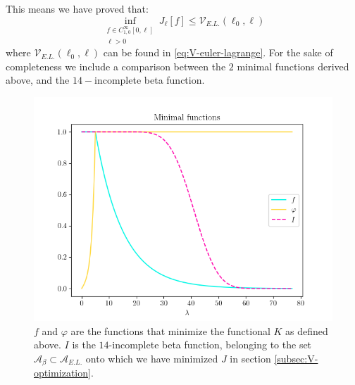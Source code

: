 This means we have proved that:
\[
    \inf_{\substack{f\in C^{\infty}_{1,0}[0, \ell]\\ \ell > 0}}J_{\ell}[f] \le \mathcal{V}_{E.L.}(\ell_0, \ell)
\]
where \(\mathcal{V}_{E.L.}(\ell_0, \ell)\) can be found in \eqref{eq:V-euler-lagrange}. 
For the sake of completeness we include a comparison between the \(2\) minimal functions derived above, and the \(14-\)incomplete beta function.
\begin{figure}
    \includegraphics[scale=0.9]{Immagini/minimal-functions.png}
    \caption[]{\(f\) and \(\varphi\) are the functions that minimize the functional \(K\) as defined above. \(I\) is the \(14\)-incomplete beta function, belonging to the set \(\mathcal{A}_{\beta} \subset \mathcal{A}_{E.L.}\) onto which we have minimized \(J\) in section \ref{subsec:V-optimization}.}
\end{figure}